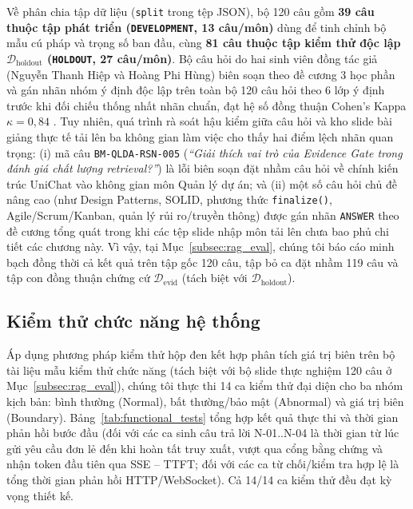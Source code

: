 \documentclass{IEEEtran}
\begin{document}
Về phân chia tập dữ liệu (\texttt{split} trong tệp JSON), bộ 120 câu gồm \textbf{39 câu thuộc tập phát triển (\texttt{DEVELOPMENT}, 13 câu/môn)} dùng để tinh chỉnh bộ mẫu cú pháp và trọng số ban đầu, cùng \textbf{81 câu thuộc tập kiểm thử độc lập $\mathcal{D}_{\text{holdout}}$ (\texttt{HOLDOUT}, 27 câu/môn)}. Bộ câu hỏi do hai sinh viên đồng tác giả (Nguyễn Thanh Hiệp và Hoàng Phi Hùng) biên soạn theo đề cương 3 học phần và gán nhãn nhóm ý định độc lập trên toàn bộ 120 câu hỏi theo 6 lớp ý định trước khi đối chiếu thống nhất nhãn chuẩn, đạt hệ số đồng thuận Cohen's Kappa $\kappa = 0{,}84$ \cite{cohen1960kappa}. Tuy nhiên, quá trình rà soát hậu kiểm giữa câu hỏi và kho slide bài giảng thực tế tải lên ba không gian làm việc cho thấy hai điểm lệch nhãn quan trọng: (i) mã câu \texttt{BM-QLDA-RSN-005} (\textit{``Giải thích vai trò của Evidence Gate trong đánh giá chất lượng retrieval?''}) là lỗi biên soạn đặt nhầm câu hỏi về chính kiến trúc UniChat vào không gian môn Quản lý dự án; và (ii) một số câu hỏi chủ đề nâng cao (như Design Patterns, SOLID, phương thức \texttt{finalize()}, Agile/Scrum/Kanban, quản lý rủi ro/truyền thông) được gán nhãn \texttt{ANSWER} theo đề cương tổng quát trong khi các tệp slide nhập môn tải lên chưa bao phủ chi tiết các chương này. Vì vậy, tại Mục~\ref{subsec:rag_eval}, chúng tôi báo cáo minh bạch đồng thời cả kết quả trên tập gốc 120 câu, tập bỏ ca đặt nhầm 119 câu và tập con đồng thuận chứng cứ $\mathcal{D}_{\text{evid}}$ (tách biệt với $\mathcal{D}_{\text{holdout}}$).

\subsection{Kiểm thử chức năng hệ thống}
Áp dụng phương pháp kiểm thử hộp đen kết hợp phân tích giá trị biên trên bộ tài liệu mẫu kiểm thử chức năng (tách biệt với bộ slide thực nghiệm 120 câu ở Mục~\ref{subsec:rag_eval}), chúng tôi thực thi 14 ca kiểm thử đại diện cho ba nhóm kịch bản: bình thường (Normal), bất thường/bảo mật (Abnormal) và giá trị biên (Boundary). Bảng~\ref{tab:functional_tests} tổng hợp kết quả thực thi và thời gian phản hồi bước đầu (đối với các ca sinh câu trả lời N-01..N-04 là thời gian từ lúc gửi yêu cầu đơn lẻ đến khi hoàn tất truy xuất, vượt qua cổng bằng chứng và nhận token đầu tiên qua SSE -- TTFT; đối với các ca từ chối/kiểm tra hợp lệ là tổng thời gian phản hồi HTTP/WebSocket). Cả 14/14 ca kiểm thử đều đạt kỳ vọng thiết kế.
\end{document}
